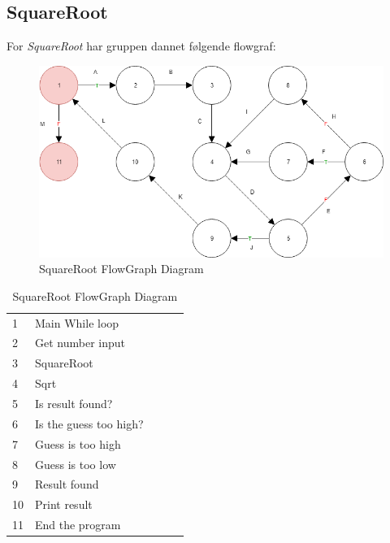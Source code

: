 \documentclass[11pt]{article}
\begin{document}
    \subsection{SquareRoot}
    \noindent
    For \textit{SquareRoot} har gruppen dannet følgende flowgraf:\\
    \begin{table}[H]
        \begin{minipage}{.7\textwidth}
            \begin{figure}[H]
                \centering
                \includegraphics[width=1\textwidth,angle=0]{Struktureret_System_Udvikling/Workshop_3/SquareRoot_FlowGraph.png}
                \caption{SquareRoot FlowGraph Diagram}
                \label{fig:SquearRootGraph}
            \end{figure}
        \end{minipage}
        \begin{minipage}{.3\textwidth}
            \quad
            \begin{tabular}{lllll}
                1 & Main While loop\\
                2 & Get number input\\
                3 & SquareRoot\\
                4 & Sqrt\\
                5 & Is result found?\\
                6 & Is the guess too high?\\
                7 & Guess is too high\\
                8 & Guess is too low\\
                9 & Result found \\
                10 & Print result\\
                11 & End the program\\
            \end{tabular}
        \end{minipage}
    \end{table}
\end{document}
